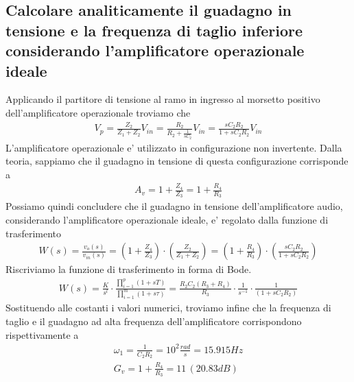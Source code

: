 \documentclass[a4paper,10pt]{article}
\begin{document}
\subsection{Calcolare analiticamente  il guadagno in tensione e la frequenza di taglio inferiore considerando l'amplificatore operazionale ideale}
Applicando il partitore di tensione al ramo in ingresso al morsetto positivo dell'amplificatore operazionale troviamo che
	\begin{align*}
      V_p = \frac{Z_2}{Z_1+Z_2}V_{in} = \frac{R_2}{R_2 + \frac{1}{sC_2}}V_{in} = \frac{sC_2R_2}{1+sC_2R_2}V_{in}
    \end{align*}
L'amplificatore operazionale e' utilizzato in configurazione non invertente. Dalla teoria, sappiamo che il guadagno in tensione di questa configurazione corrisponde a
	\begin{align*}
      A_v = 1+\frac{Z_4}{Z_3} = 1+\frac{R_4}{R_3}
    \end{align*}
Possiamo quindi concludere che il guadagno in tensione dell'amplificatore audio, considerando l'amplificatore operazionale ideale, e' regolato dalla funzione di trasferimento
	\begin{align*}
      W(s) = \frac{v_o(s)}{v_{in}(s)} =(1+\frac{Z_4}{Z_3})\cdot(\frac{Z_2}{Z_1+Z_2}) = (1+\frac{R_4}{R_3})\cdot(\frac{sC_2R_2}{1+sC_2R_2})
    \end{align*}
Riscriviamo la funzione di trasferimento in forma di Bode.
	\begin{align*}
      W(s) = \frac{K}{s^l}\cdot\frac{\prod\limits_{i=1}^{p}(1+sT)}{\prod\limits_{i=1}^{m}(1+s\tau)} = \frac{R_2C_2(R_3+R_4)}{R_3}\cdot\frac{1}{s^{-1}}\cdot\frac{1}{(1+sC_2R_2)}
    \end{align*}
Sostituendo alle costanti i valori numerici, troviamo infine che la frequenza di taglio e il guadagno ad alta frequenza dell'amplificatore corrispondono rispettivamente a
\begin{gather*}
	\omega_1 = \frac{1}{C_2R_2} = 10^2\frac{rad}{s} = 15.915Hz \\
	G_v = 1+\frac{R_4}{R_3} = 11\,(20.83dB)
\end{gather*}

\newpage
\end{document}
